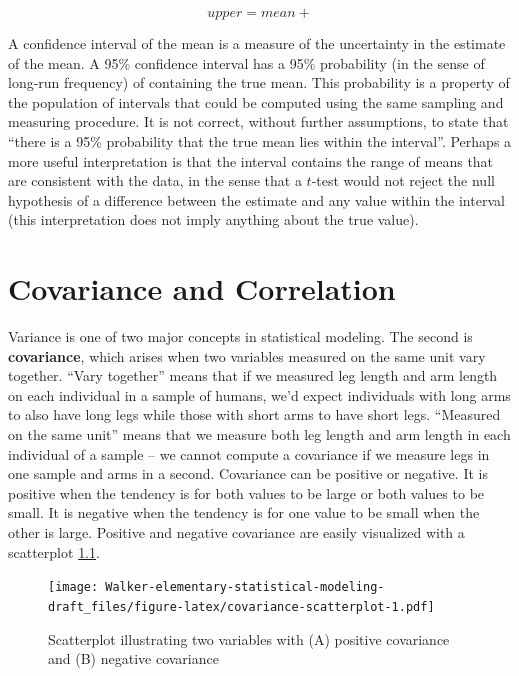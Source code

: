 \documentclass[]{book}
\begin{document}
\begin{equation}
upper = mean + 
\end{equation}

A confidence interval of the mean is a measure of the uncertainty in the
estimate of the mean. A 95\% confidence interval has a 95\% probability
(in the sense of long-run frequency) of containing the true mean. This
probability is a property of the population of intervals that could be
computed using the same sampling and measuring procedure. It is not
correct, without further assumptions, to state that ``there is a 95\%
probability that the true mean lies within the interval''. Perhaps a
more useful interpretation is that the interval contains the range of
means that are consistent with the data, in the sense that a \(t\)-test
would not reject the null hypothesis of a difference between the
estimate and any value within the interval (this interpretation does not
imply anything about the true value).

\chapter{Covariance and Correlation}\label{covariance-and-correlation}

Variance is one of two major concepts in statistical modeling. The
second is \textbf{covariance}, which arises when two variables measured
on the same unit vary together. ``Vary together'' means that if we
measured leg length and arm length on each individual in a sample of
humans, we'd expect individuals with long arms to also have long legs
while those with short arms to have short legs. ``Measured on the same
unit'' means that we measure both leg length and arm length in each
individual of a sample -- we cannot compute a covariance if we measure
legs in one sample and arms in a second. Covariance can be positive or
negative. It is positive when the tendency is for both values to be
large or both values to be small. It is negative when the tendency is
for one value to be small when the other is large. Positive and negative
covariance are easily visualized with a scatterplot
\ref{fig:covariance-scatterplot}.

\begin{figure}
\centering
\texttt{[image: Walker-elementary-statistical-modeling-draft\_files/figure-latex/covariance-scatterplot-1.pdf]}
\caption{\label{fig:covariance-scatterplot}Scatterplot illustrating two
variables with (A) positive covariance and (B) negative covariance}
\end{figure}
\end{document}
